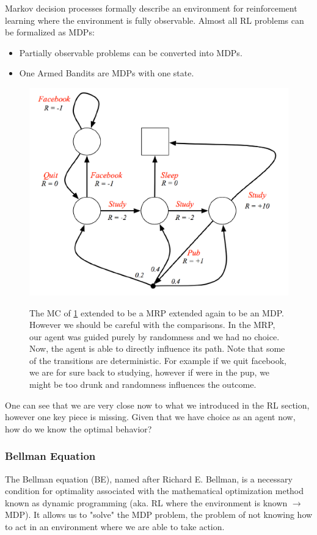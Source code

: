 \documentclass[main]{subfiles}
\begin{document}
Markov decision processes formally describe an environment for reinforcement learning where the environment is fully observable.
Almost all RL problems can be formalized as MDPs:

\begin{itemize}
    \item Partially observable problems can be converted into MDPs.
    \item One Armed Bandits are MDPs with one state.
\end{itemize}

\begin{figure}[H]
	\centering
	\includegraphics[width=0.9\linewidth]{08_ReinforcementLearning/figures/mdp-example.png}
	\label{fig:mrp-example}
	\caption{The MC of \ref{fig:mrp-example} extended to be a MRP extended again to be an MDP. However we should be careful with the comparisons. In the MRP, our agent was guided purely by randomness and we had no choice. Now, the agent is able to directly influence its path. Note that some of the transitions are deterministic. For example if we quit facebook, we are for sure back to studying, however if were in the pup, we might be too drunk and randomness influences the outcome.}
\end{figure}

One can see that we are very close now to what we introduced in the RL section, however one key piece is missing.  Given that we have choice as an agent now, how do we know the optimal behavior?

\subsubsection{Bellman Equation}
The Bellman equation (BE), named after Richard E. Bellman, is a necessary condition for optimality associated with the mathematical optimization method known as dynamic programming (aka. RL where the environment is known $\longrightarrow$ MDP). It allows us to "solve" the MDP problem, the problem of not knowing how to act in an environment where we are able to take action.
\end{document}
